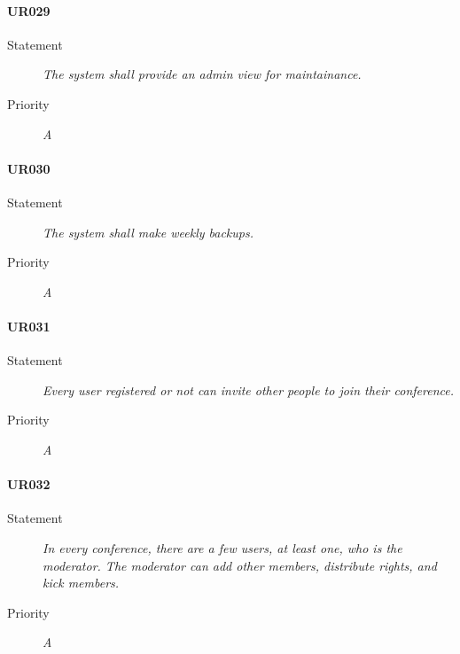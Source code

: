 \paragraph{UR029}
\begin{description}
\item[Statement] \textit{The system shall provide an admin view for
    maintainance.}
\item[Priority] \textit{A}
\end{description}

\paragraph{UR030}
\begin{description}
\item[Statement] \textit{The system shall make weekly backups.}
\item[Priority] \textit{A}
\end{description}

\paragraph{UR031}
\begin{description}
\item[Statement] \textit{Every user registered or not can invite other people
    to join their conference.}
\item[Priority] \textit{A}
\end{description}

\paragraph{UR032}
\begin{description}
\item[Statement] \textit{In every conference, there are a few users, at least
    one, who is the moderator. The moderator can add other members, distribute
    rights, and kick members.}
\item[Priority] \textit{A}
\end{description}


